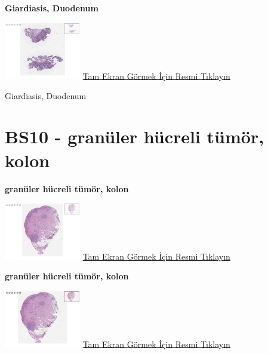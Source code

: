 \documentclass[
  letterpaper,
  DIV=11,
  numbers=noendperiod]{scrreprt}
\begin{document}
\textbf{Giardiasis, Duodenum}

\href{https://images.patolojiatlasi.com/BS9/HE2.html}{\includegraphics[width=0.25\textwidth,height=\textheight]{./screenshots/thumbnail_BS9-HE2.png}}
\href{https://images.patolojiatlasi.com/BS9/HE2.html}{Tam Ekran Görmek
İçin Resmi Tıklayın}

\begin{tcolorbox}[enhanced jigsaw, colbacktitle=quarto-callout-tip-color!10!white, colback=white, titlerule=0mm, opacityback=0, colframe=quarto-callout-tip-color-frame, opacitybacktitle=0.6, bottomrule=.15mm, breakable, coltitle=black, title=\textcolor{quarto-callout-tip-color}{\faLightbulb}\hspace{0.5em}{Tanı}, toprule=.15mm, toptitle=1mm, bottomtitle=1mm, arc=.35mm, rightrule=.15mm, leftrule=.75mm, left=2mm]

Giardiasis, Duodenum

\end{tcolorbox}

\hypertarget{sec-BS10}{%
\section{BS10 - granüler hücreli tümör, kolon}\label{sec-BS10}}

\textbf{granüler hücreli tümör, kolon}

\href{https://images.patolojiatlasi.com/BS10/HE1.html}{\includegraphics[width=0.25\textwidth,height=\textheight]{./screenshots/thumbnail_BS10-HE1.png}}
\href{https://images.patolojiatlasi.com/BS10/HE1.html}{Tam Ekran Görmek
İçin Resmi Tıklayın}

\textbf{granüler hücreli tümör, kolon}

\href{https://images.patolojiatlasi.com/BS10/HE2.html}{\includegraphics[width=0.25\textwidth,height=\textheight]{./screenshots/thumbnail_BS10-HE2.png}}
\href{https://images.patolojiatlasi.com/BS10/HE2.html}{Tam Ekran Görmek
İçin Resmi Tıklayın}
\end{document}
